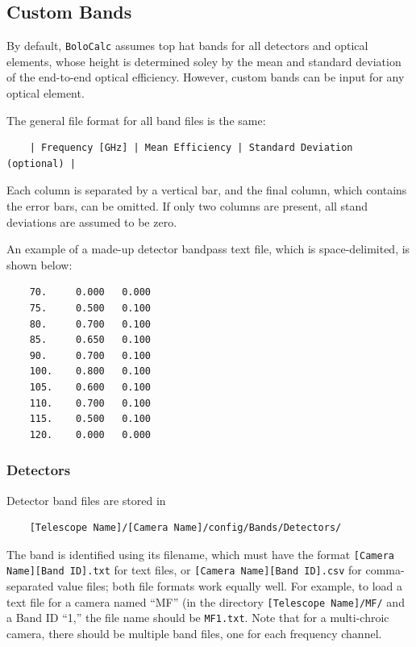 \documentclass[11pt]{article} %
\begin{document}

\subsection{Custom Bands}

By default, \texttt{BoloCalc} assumes top hat bands for all detectors and optical elements, whose height is determined soley by the mean and standard deviation of the end-to-end optical efficiency. However, custom bands can be input for any optical element.

The general file format for all band files is the same:

\begin{lstlisting}
	| Frequency [GHz] | Mean Efficiency | Standard Deviation (optional) |
\end{lstlisting}

Each column is separated by a vertical bar, and the final column, which contains the error bars, can be omitted. If only two columns are present, all stand deviations are assumed to be zero.

An example of a made-up detector bandpass text file, which is space-delimited, is shown below:

\begin{lstlisting}
	70.     0.000   0.000
	75.     0.500   0.100
	80.     0.700   0.100
	85.     0.650   0.100
	90.     0.700   0.100
	100.    0.800   0.100
	105.    0.600   0.100
	110.    0.700   0.100
	115.    0.500   0.100
	120.    0.000   0.000
\end{lstlisting}


\subsubsection{Detectors}

Detector band files are stored in

\begin{lstlisting}
	[Telescope Name]/[Camera Name]/config/Bands/Detectors/
\end{lstlisting}

The band is identified using its filename, which must have the format \texttt{[Camera Name][Band ID].txt} for text files, or \texttt{[Camera Name][Band ID].csv} for comma-separated value files; both file formats work equally well. For example, to load a text file for a camera named ``MF'' (in the directory \texttt{[Telescope Name]/MF/} and a Band ID ``1,'' the file name should be \texttt{MF1.txt}. Note that for a multi-chroic camera, there should be multiple band files, one for each frequency channel.
\end{document}
